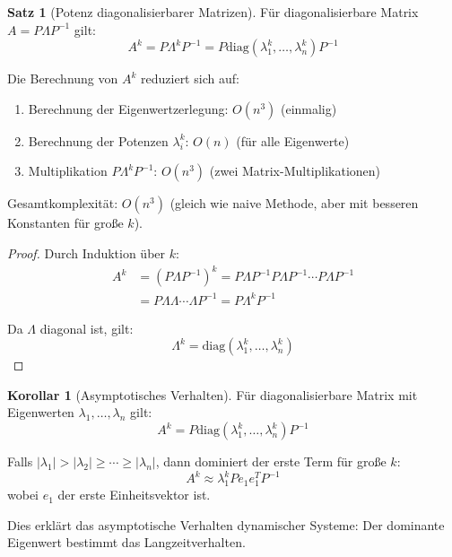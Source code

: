 ﻿\documentclass[a4paper,12pt]{report}
\theoremstyle{definition}
\newtheorem{satz}{Satz}
\newtheorem{korollar}{Korollar}
\begin{document}
	\begin{satz}[Potenz diagonalisierbarer Matrizen]
		Für diagonalisierbare Matrix $A = P \Lambda P^{-1}$ gilt:
		\[
		A^k = P \Lambda^k P^{-1} = P \text{diag}(\lambda_1^k, \ldots, \lambda_n^k) P^{-1}
		\]
		
		Die Berechnung von $A^k$ reduziert sich auf:
		\begin{enumerate}
			\item Berechnung der Eigenwertzerlegung: $O(n^3)$ (einmalig)
			\item Berechnung der Potenzen $\lambda_i^k$: $O(n)$ (für alle Eigenwerte)
			\item Multiplikation $P \Lambda^k P^{-1}$: $O(n^3)$ (zwei Matrix-Multiplikationen)
		\end{enumerate}
		
		Gesamtkomplexität: $O(n^3)$ (gleich wie naive Methode, aber mit besseren Konstanten für große $k$).
	\end{satz}
	
	\begin{proof}
		Durch Induktion über $k$:
		\begin{align}
			A^k &= (P \Lambda P^{-1})^k = P \Lambda P^{-1} P \Lambda P^{-1} \cdots P \Lambda P^{-1} \\
			&= P \Lambda \Lambda \cdots \Lambda P^{-1} = P \Lambda^k P^{-1}
		\end{align}
		
		Da $\Lambda$ diagonal ist, gilt:
		\[
		\Lambda^k = \text{diag}(\lambda_1^k, \ldots, \lambda_n^k)
		\]
	\end{proof}
	
	\begin{korollar}[Asymptotisches Verhalten]
		Für diagonalisierbare Matrix mit Eigenwerten $\lambda_1, \ldots, \lambda_n$ gilt:
		\[
		A^k = P \text{diag}(\lambda_1^k, \ldots, \lambda_n^k) P^{-1}
		\]
		
		Falls $|\lambda_1| > |\lambda_2| \geq \cdots \geq |\lambda_n|$, dann dominiert der erste Term für große $k$:
		\[
		A^k \approx \lambda_1^k P e_1 e_1^T P^{-1}
		\]
		wobei $e_1$ der erste Einheitsvektor ist.
		
		Dies erklärt das asymptotische Verhalten dynamischer Systeme: Der dominante Eigenwert bestimmt das Langzeitverhalten.
	\end{korollar}
	
\end{document}
